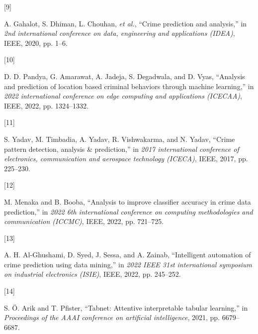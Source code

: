 \documentclass[conference,final, 10pt]{IEEEtran}
\newlength{\cslhangindent}
\newlength{\csllabelwidth}
\newenvironment{CSLReferences}[2] %
 {\begin{list}{}{%
  \setlength{\itemindent}{0pt}
  \setlength{\leftmargin}{0pt}
  \setlength{\parsep}{0pt}
  \ifodd #1
   \setlength{\leftmargin}{\cslhangindent}
   \setlength{\itemindent}{-1\cslhangindent}
  \fi
  \setlength{\itemsep}{#2\baselineskip}}}
 {\end{list}}
\newcommand{\CSLLeftMargin}[1]{\parbox[t]{\csllabelwidth}{#1}}
\newcommand{\CSLRightInline}[1]{\parbox[t]{\linewidth - \csllabelwidth}{#1}\break}
\begin{document}
\begin{CSLReferences}{0}{0}
\CSLLeftMargin{{[}9{]} }%
\CSLRightInline{A. Gahalot, S. Dhiman, L. Chouhan, \emph{et al.},
{``Crime prediction and analysis,''} in \emph{2nd international
conference on data, engineering and applications (IDEA)}, IEEE, 2020,
pp. 1--6.}

\CSLLeftMargin{{[}10{]} }%
\CSLRightInline{D. D. Pandya, G. Amarawat, A. Jadeja, S. Degadwala, and
D. Vyas, {``Analysis and prediction of location based criminal behaviors
through machine learning,''} in \emph{2022 international conference on
edge computing and applications (ICECAA)}, IEEE, 2022, pp. 1324--1332.}

\CSLLeftMargin{{[}11{]} }%
\CSLRightInline{S. Yadav, M. Timbadia, A. Yadav, R. Vishwakarma, and N.
Yadav, {``Crime pattern detection, analysis \& prediction,''} in
\emph{2017 international conference of electronics, communication and
aerospace technology (ICECA)}, IEEE, 2017, pp. 225--230.}

\CSLLeftMargin{{[}12{]} }%
\CSLRightInline{M. Menaka and B. Booba, {``Analysis to improve
classifier accuracy in crime data prediction,''} in \emph{2022 6th
international conference on computing methodologies and communication
(ICCMC)}, IEEE, 2022, pp. 721--725.}

\CSLLeftMargin{{[}13{]} }%
\CSLRightInline{A. H. Al-Ghushami, D. Syed, J. Sessa, and A. Zainab,
{``Intelligent automation of crime prediction using data mining,''} in
\emph{2022 IEEE 31st international symposium on industrial electronics
(ISIE)}, IEEE, 2022, pp. 245--252.}

\CSLLeftMargin{{[}14{]} }%
\CSLRightInline{S. Ö. Arik and T. Pfister, {``Tabnet: Attentive
interpretable tabular learning,''} in \emph{Proceedings of the AAAI
conference on artificial intelligence}, 2021, pp. 6679--6687.}

\end{CSLReferences}
\end{document}

